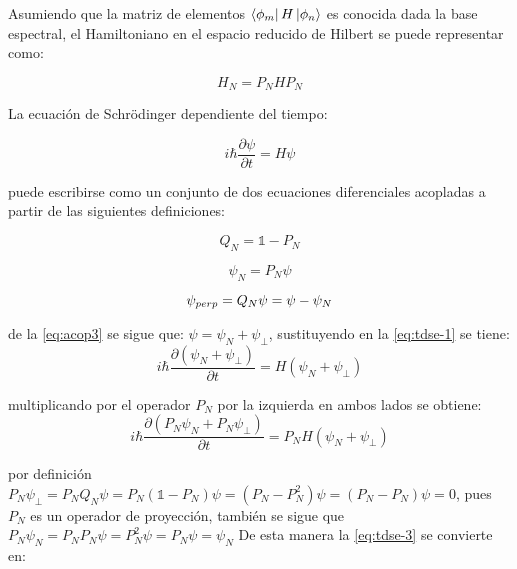 Asumiendo que la matriz de elementos $\bra{\phi_m}H\ket{\phi_n}$ es conocida dada la base espectral, el Hamiltoniano en el espacio reducido de Hilbert se puede representar como:

\begin{equation}
  \label{eq:Hamiltonianored}
  H_N = P_NHP_N
\end{equation}

La ecuación de Schrödinger dependiente del tiempo:

\begin{equation}
  \label{eq:tdse-1}
  i\hbar\frac{\partial \psi}{\partial t} = H \psi
\end{equation}

puede escribirse como un conjunto de dos ecuaciones diferenciales acopladas a partir de las siguientes definiciones: \cite{Tannor:2006}

\begin{equation}
  \label{eq:acop1}
  Q_N = \mathbb{1} - P_N
\end{equation}

\begin{equation}
  \label{eq:acop2}
  \psi_N = P_N\psi
\end{equation}

\begin{equation}
  \label{eq:acop3}
  \psi_{\\perp}=Q_N\psi = \psi - \psi_{N}
\end{equation}

de la \autoref{eq:acop3} se sigue que: $\psi = \psi_N + \psi_{\perp}$, sustituyendo en la \autoref{eq:tdse-1} se tiene:
\begin{equation}
  \label{eq:tdse-2}
  i\hbar\frac{\partial (\psi_N + \psi_{\perp})}{\partial t} = H (\psi_N + \psi_{\perp})
\end{equation}

multiplicando por el operador $P_N$ por la izquierda en ambos lados se obtiene:
\begin{equation}
   \label{eq:tdse-3}
  i\hbar\frac{\partial (P_N \psi_N + P_N \psi_{\perp})}{\partial t} = P_NH (\psi_N + \psi_{\perp})
\end{equation}

por definición $P_N \psi_{\perp}= P_NQ_N\psi = P_N(\mathbb{1}-P_N)\psi = (P_N - P_N^2)\psi = (P_N-P_N)\psi=0$, pues $P_N$ es un operador de proyección, también se sigue que $P_N\psi_N = P_N P_N \psi = P_N^2 \psi = P_N\psi = \psi_N$
De esta manera la \autoref{eq:tdse-3} se convierte en:

